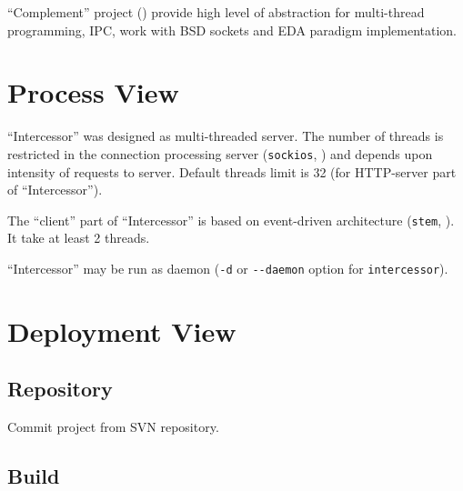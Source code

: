 \documentclass[a4paper,twoside]{article}
\newcommand{\Inter}{{\fontseries{b}\selectfont ``Intercessor''}}
\begin{document}
``Complement'' project (\cite{ComplementProject}) provide high level of abstraction for multi-thread programming,
IPC, work with BSD sockets and EDA paradigm implementation.


%
%
%

\section{Process View\label{ProcessView}}


\Inter{} was designed as multi-threaded server. The number of threads is restricted
in the connection processing server (\verb|sockios|, \cite{ComplementProject}) and
depends upon intensity of requests to server. Default threads limit is 32 (for HTTP-server
part of \Inter{}).

The ``client'' part of \Inter{} is based on event-driven architecture (\verb|stem|, \cite{ComplementProject}).
It take at least 2 threads.

\Inter{} may be run as daemon (\verb|-d| or \verb|--daemon| option for \verb|intercessor|).

\section{Deployment View\label{DeplView}}

\subsection{Repository}

Commit project from SVN repository.

\subsection{Build}
\end{document}
